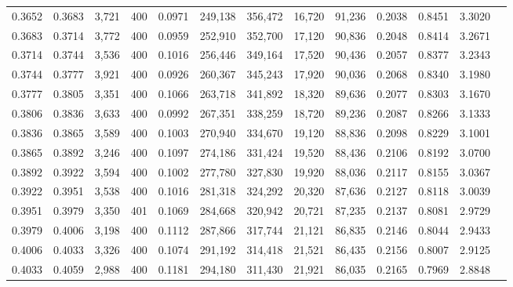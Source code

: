 \begin{tabular}{rrrrrrrrrrrrr}
0.3652 & 0.3683 &  3,721 & 400 &                                     0.0971 & 249,138 & 356,472 &  16,720 &  91,236 & 0.2038 & 0.8451 & 3.3020 \\
0.3683 & 0.3714 &  3,772 & 400 &                                     0.0959 & 252,910 & 352,700 &  17,120 &  90,836 & 0.2048 & 0.8414 & 3.2671 \\
0.3714 & 0.3744 &  3,536 & 400 &                                     0.1016 & 256,446 & 349,164 &  17,520 &  90,436 & 0.2057 & 0.8377 & 3.2343 \\
0.3744 & 0.3777 &  3,921 & 400 &                                     0.0926 & 260,367 & 345,243 &  17,920 &  90,036 & 0.2068 & 0.8340 & 3.1980 \\
0.3777 & 0.3805 &  3,351 & 400 &                                     0.1066 & 263,718 & 341,892 &  18,320 &  89,636 & 0.2077 & 0.8303 & 3.1670 \\
0.3806 & 0.3836 &  3,633 & 400 &                                     0.0992 & 267,351 & 338,259 &  18,720 &  89,236 & 0.2087 & 0.8266 & 3.1333 \\
0.3836 & 0.3865 &  3,589 & 400 &                                     0.1003 & 270,940 & 334,670 &  19,120 &  88,836 & 0.2098 & 0.8229 & 3.1001 \\
0.3865 & 0.3892 &  3,246 & 400 &                                     0.1097 & 274,186 & 331,424 &  19,520 &  88,436 & 0.2106 & 0.8192 & 3.0700 \\
0.3892 & 0.3922 &  3,594 & 400 &                                     0.1002 & 277,780 & 327,830 &  19,920 &  88,036 & 0.2117 & 0.8155 & 3.0367 \\
0.3922 & 0.3951 &  3,538 & 400 &                                     0.1016 & 281,318 & 324,292 &  20,320 &  87,636 & 0.2127 & 0.8118 & 3.0039 \\
0.3951 & 0.3979 &  3,350 & 401 &                                     0.1069 & 284,668 & 320,942 &  20,721 &  87,235 & 0.2137 & 0.8081 & 2.9729 \\
0.3979 & 0.4006 &  3,198 & 400 &                                     0.1112 & 287,866 & 317,744 &  21,121 &  86,835 & 0.2146 & 0.8044 & 2.9433 \\
0.4006 & 0.4033 &  3,326 & 400 &                                     0.1074 & 291,192 & 314,418 &  21,521 &  86,435 & 0.2156 & 0.8007 & 2.9125 \\
0.4033 & 0.4059 &  2,988 & 400 &                                     0.1181 & 294,180 & 311,430 &  21,921 &  86,035 & 0.2165 & 0.7969 & 2.8848 \\

\end{tabular}
